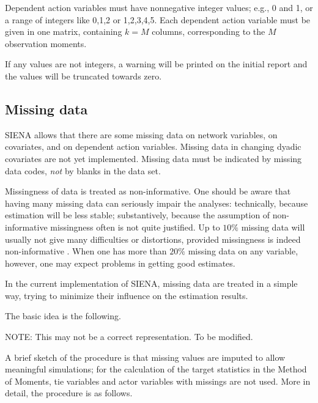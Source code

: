 \documentclass[a4paper,fleqn,11pt]{article}
\newcommand{\+}{\, + \,}
\newcommand{\SI}{{\sf SIENA }}
\newcommand{\si}{{\sf SIENA}}
\begin{document}
{Dependent action variables must have nonnegative integer values;
e.g., 0 and 1, or a range of integers like 0,1,2 or 1,2,3,4,5.
Each dependent action variable must be given in one
matrix, containing $k = M$ columns, corresponding to the $M$
observation moments.

If any values are not integers, a warning will be printed on the initial report
and the values will be truncated towards zero.


\subsection{Missing data}

\SI allows that there are some missing data on network variables,
on covariates, and on dependent action
variables. Missing data in changing dyadic covariates are not yet
implemented. Missing data must be indicated by missing data codes,
{\em not} by blanks in the data set.

Missingness of data is treated as non-informative.
One should be aware that having many missing data can seriously
impair the analyses: technically, because estimation will be
less stable; substantively, because the assumption of
non-informative missingness often is not quite justified.
Up to $10\%$ missing data will usually not give many difficulties
or distortions, provided missingness is indeed non-informative
\citep{HuismanSteglich08}.
When one has more than $20\%$ missing data on any variable, however,
one may expect problems in getting good estimates.

In the current implementation of \si, missing data are treated in
a simple way, trying to minimize their influence on the estimation
results.

The basic idea is the following.
\medskip

NOTE: This may not be a correct representation. To be modified.
\medskip

A brief sketch of the procedure is that
missing values are imputed to allow meaningful simulations;
for the calculation of the target statistics in the Method of Moments,
tie variables and actor variables with missings are not
used.
More in detail, the procedure is as follows.

}
\end{document}
